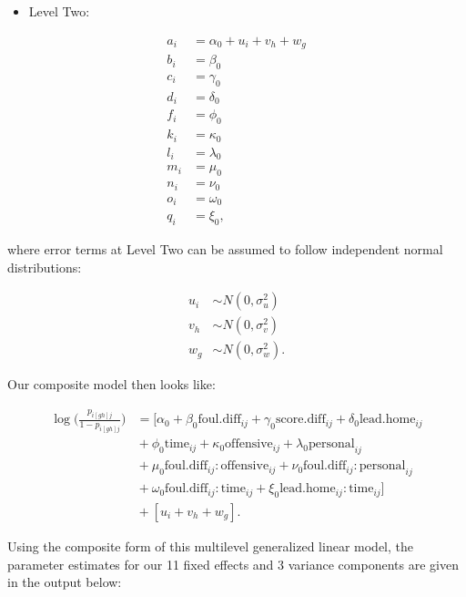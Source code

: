 \documentclass[
]{krantz}
\providecommand{\tightlist}{%
  \setlength{\itemsep}{0pt}\setlength{\parskip}{0pt}}
\begin{document}
\begin{itemize}
\tightlist
\item
  Level Two:
\end{itemize}

\begin{align*}
a_{i} & = \alpha_{0}+u_{i}+v_{h}+w_{g} \\
b_{i} & = \beta_{0} \\
c_{i} & = \gamma_{0} \\
d_{i} & = \delta_{0} \\
f_{i} & = \phi_{0} \\
k_{i} & = \kappa_{0} \\
l_{i} & = \lambda_{0} \\
m_{i} & = \mu_{0} \\
n_{i} & = \nu_{0} \\
o_{i} & = \omega_{0} \\
q_{i} & = \xi_{0},
\end{align*}

where error terms at Level Two can be assumed to follow independent normal distributions:

\begin{align*}
u_{i} & \sim N \left( 0 , \sigma_{u}^{2} \right) \\
v_{h} & \sim N \left( 0 , \sigma_{v}^{2} \right) \\
w_{g} & \sim N \left( 0 , \sigma_{w}^{2} \right).
\end{align*}

Our composite model then looks like:

\begin{align*}
\log\bigg(\frac{p_{i[gh]j}}{1-p_{i[gh]j}}\bigg) & = [\alpha_{0} + \beta_{0}\mathrm{foul.diff}_{ij} + \gamma_{0}\mathrm{score.diff}_{ij} + \delta_{0}\mathrm{lead.home}_{ij} \\ 
 &{} + \phi_{0}\mathrm{time}_{ij} + \kappa_{0}\mathrm{offensive}_{ij} + \lambda_{0}\mathrm{personal}_{ij} \\ 
 &{} + \mu_{0}\mathrm{foul.diff}_{ij}:\mathrm{offensive}_{ij} + \nu_{0}\mathrm{foul.diff}_{ij}:\mathrm{personal}_{ij} \\ 
 &{} + \omega_{0}\mathrm{foul.diff}_{ij}:\mathrm{time}_{ij} + \xi_{0}\mathrm{lead.home}_{ij}:\mathrm{time}_{ij}] \\ 
 &{} + [u_{i}+v_{h}+w_{g}].
\end{align*}

Using the composite form of this multilevel generalized linear model, the parameter estimates for our 11 fixed effects and 3 variance components are given in the output below:
\end{document}
